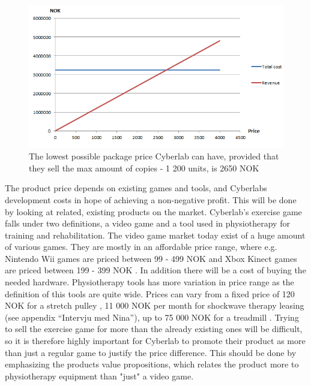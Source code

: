 \begin{figure}
\label{fig:RevenueStreamPrice}
\begin{center}
\includegraphics[scale=0.8]{revenuestreamprice}
\caption[Price example]{The lowest possible package price Cyberlab can have, provided that they sell the max amount of  copies - 1 200 units, is 2650 NOK}
\end{center}
\end{figure}
The product price depends on existing games and tools, and Cyberlabs development costs in hope of achieving a non-negative profit. This will be done by looking at related, existing products on the market. Cyberlab's exercise game falls under two definitions, a video game and a tool used in physiotherapy for training and rehabilitation. The video game market today exist of a huge amount of various games. They are mostly in an affordable price range, where e.g. Nintendo Wii games are priced between 99 - 499 NOK \cite{elkjopwii} and Xbox Kinect games are priced between 199 - 399 NOK \cite{elkjopkinect}. In addition there will be a cost of buying the needed hardware. Physiotherapy tools has more variation in price range as the definition of this tools are quite wide. Prices can vary from a fixed price of 120 NOK for a stretch pulley \cite{stretchpulley}, 11 000 NOK per month for shockwave therapy leasing (see appendix “Intervju med Nina”), up to 75 000 NOK for a treadmill \cite{treadmill}. Trying to sell the exercise game for more than the already existing ones will be difficult, so it is therefore highly important for Cyberlab to promote their product as more than just a regular game to justify the price difference. This should be done by emphasizing the products value propositions, which relates the product more to physiotherapy equipment than "just" a video game. \\ \\
